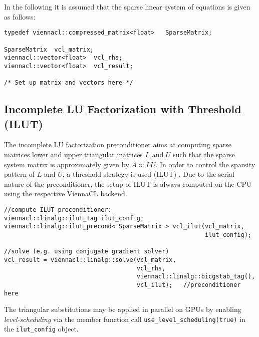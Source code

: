 In the following it is assumed that the sparse linear system of equations is given as follows:
\begin{lstlisting}
typedef viennacl::compressed_matrix<float>   SparseMatrix;

SparseMatrix  vcl_matrix;
viennacl::vector<float>  vcl_rhs;
viennacl::vector<float>  vcl_result;

/* Set up matrix and vectors here */
\end{lstlisting}


\subsection{Incomplete LU Factorization with Threshold (ILUT)}
The incomplete LU factorization preconditioner aims at computing sparse matrices lower and upper triangular matrices $L$ and $U$ such that the sparse system
matrix is approximately given by $A \approx LU$. In order to control the sparsity pattern of $L$ and $U$, a threshold strategy is used (ILUT)
\cite{saad-iterative-solution}. Due to the serial nature of the preconditioner, the setup of ILUT is always computed on
the CPU using the respective ViennaCL backend. 

\begin{lstlisting}
//compute ILUT preconditioner:
viennacl::linalg::ilut_tag ilut_config;
viennacl::linalg::ilut_precond< SparseMatrix > vcl_ilut(vcl_matrix,
                                                        ilut_config);

//solve (e.g. using conjugate gradient solver)
vcl_result = viennacl::linalg::solve(vcl_matrix,
                                     vcl_rhs,
                                     viennacl::linalg::bicgstab_tag(),
                                     vcl_ilut);   //preconditioner here
\end{lstlisting}
The triangular substitutions may be applied in parallel on GPUs by enabling \emph{level-scheduling} \cite{saad-iterative-solution} via the member function call \lstinline|use_level_scheduling(true)| in the \lstinline|ilut_config| object.

